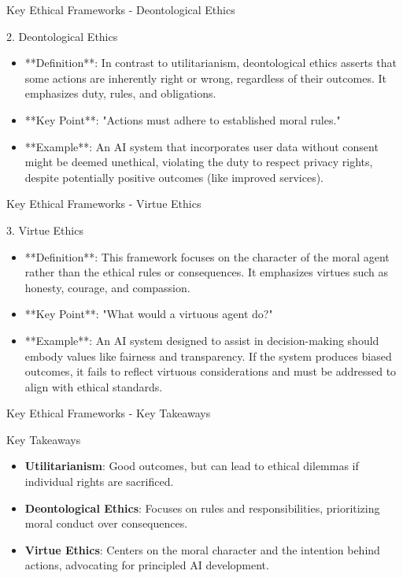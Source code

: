 \documentclass[aspectratio=169]{beamer}
\begin{document}
\begin{frame}[fragile]{Key Ethical Frameworks - Deontological Ethics}
    \begin{block}{2. Deontological Ethics}
        \begin{itemize}
            \item **Definition**: In contrast to utilitarianism, deontological ethics asserts that some actions are inherently right or wrong, regardless of their outcomes. It emphasizes duty, rules, and obligations.
            \item **Key Point**: "Actions must adhere to established moral rules."
            \item **Example**: An AI system that incorporates user data without consent might be deemed unethical, violating the duty to respect privacy rights, despite potentially positive outcomes (like improved services).
        \end{itemize}
    \end{block}
\end{frame}

\begin{frame}[fragile]{Key Ethical Frameworks - Virtue Ethics}
    \begin{block}{3. Virtue Ethics}
        \begin{itemize}
            \item **Definition**: This framework focuses on the character of the moral agent rather than the ethical rules or consequences. It emphasizes virtues such as honesty, courage, and compassion.
            \item **Key Point**: "What would a virtuous agent do?"
            \item **Example**: An AI system designed to assist in decision-making should embody values like fairness and transparency. If the system produces biased outcomes, it fails to reflect virtuous considerations and must be addressed to align with ethical standards.
        \end{itemize}
    \end{block}
\end{frame}

\begin{frame}[fragile]{Key Ethical Frameworks - Key Takeaways}
    \begin{block}{Key Takeaways}
        \begin{itemize}
            \item \textbf{Utilitarianism}: Good outcomes, but can lead to ethical dilemmas if individual rights are sacrificed.
            \item \textbf{Deontological Ethics}: Focuses on rules and responsibilities, prioritizing moral conduct over consequences.
            \item \textbf{Virtue Ethics}: Centers on the moral character and the intention behind actions, advocating for principled AI development.
        \end{itemize}
    \end{block}
\end{frame}
\end{document}
